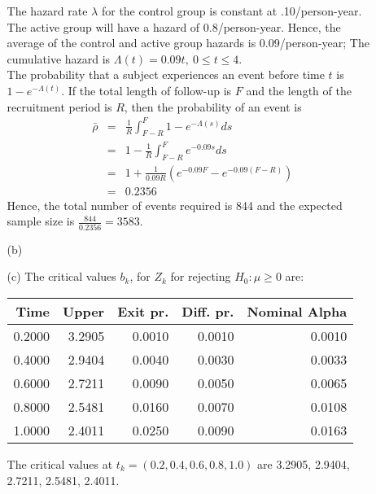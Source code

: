 \documentclass[11pt,a4paper]{article}
\begin{document}
\begin{enumerate}
\begin{enumerate}
The hazard rate $\lambda$ for the control group is constant at .10/person-year. The active group will have a hazard of 0.8/person-year. Hence, the average of the control and active group hazards is 0.09/person-year; The cumulative hazard is $\Lambda(t) = 0.09t, \ 0 \leq t \leq 4$. \\
The probability that a subject experiences an event before time $t$ is $1 - e^{-\Lambda(t)}$. If the total length of follow-up is $F$ and the length of the recruitment period is $R$, then the probability of an event is
\begin{eqnarray*}
\bar{\rho} &=& \frac{1}{R} \int_{F - R}^{F} 1 - e^{-\Lambda(s)}ds \\
           &=& 1 - \frac{1}{R} \int_{F - R}^{F} e^{-0.09s} ds \\
           &=& 1 + \frac{1}{0.09R}\left(e^{-0.09F} - e^{-0.09(F - R)} \right) \\
           &=& 0.2356
\end{eqnarray*}
Hence, the total number of events required is 844 and the expected sample size is $\frac{844}{0.2356} = 3583$. 


\item[(b)] 
\item[(c)] The critical values $b_k$, for $Z_k$ for rejecting $H_0: \mu \geq 0$ are:
\begin{table}[H]
\centering
\begin{tabular}{rrrrr}
  \hline
  Time &  Upper & Exit pr. & Diff. pr. & Nominal Alpha \\ 
  \hline
  0.2000 & 3.2905 & 0.0010 & 0.0010 & 0.0010 \\ 
  0.4000 & 2.9404 & 0.0040 & 0.0030 & 0.0033 \\ 
  0.6000 & 2.7211 & 0.0090 & 0.0050 & 0.0065 \\ 
  0.8000 & 2.5481 & 0.0160 & 0.0070 & 0.0108 \\ 
  1.0000 & 2.4011 & 0.0250 & 0.0090 & 0.0163 \\ 
  \hline
\end{tabular}
\end{table}
The critical values at $t_k = (0.2, 0.4, 0.6, 0.8, 1.0)$ are 3.2905, 2.9404, 2.7211, 2.5481, 2.4011.


\end{enumerate}
\end{enumerate}
\end{document}
